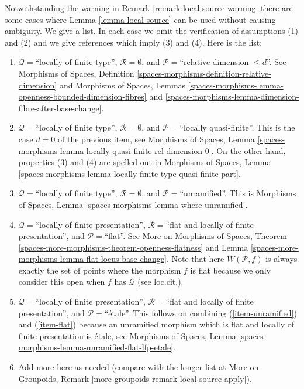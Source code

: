 \begin{remark}
\label{remark-local-source-apply}
Notwithstanding the warning in
Remark \ref{remark-local-source-warning}
there are some cases where
Lemma \ref{lemma-local-source}
can be used without causing ambiguity.
We give a list. In each case we omit the verification of
assumptions (1) and (2) and we give references which imply
(3) and (4). Here is the list:
\begin{enumerate}
\item
\label{item-rel-dim-leq-d}
$\mathcal{Q} = $``locally of finite type'', $\mathcal{R} = \emptyset$,
and $\mathcal{P} =$``relative dimension $\leq d$''.
See
Morphisms of Spaces,
Definition \ref{spaces-morphisms-definition-relative-dimension}
and
Morphisms of Spaces, Lemmas
\ref{spaces-morphisms-lemma-openness-bounded-dimension-fibres} and
\ref{spaces-morphisms-lemma-dimension-fibre-after-base-change}.
\item
\label{item-loc-quasi-finite}
$\mathcal{Q} =$``locally of finite type'', $\mathcal{R} = \emptyset$,
and $\mathcal{P} =$``locally quasi-finite''.
This is the case $d = 0$ of the previous item, see
Morphisms of Spaces, Lemma
\ref{spaces-morphisms-lemma-locally-quasi-finite-rel-dimension-0}.
On the other hand, properties (3) and (4) are spelled out in
Morphisms of Spaces, Lemma
\ref{spaces-morphisms-lemma-locally-finite-type-quasi-finite-part}.
\item
\label{item-unramified}
$\mathcal{Q} = $``locally of finite type'', $\mathcal{R} = \emptyset$,
and $\mathcal{P} =$``unramified''. This is
Morphisms of Spaces, Lemma \ref{spaces-morphisms-lemma-where-unramified}.
\item
\label{item-flat}
$\mathcal{Q} =$``locally of finite presentation'',
$\mathcal{R} =$``flat and locally of finite presentation'', and
$\mathcal{P} =$``flat''. See
More on Morphisms of Spaces, Theorem
\ref{spaces-more-morphisms-theorem-openness-flatness} and
Lemma \ref{spaces-more-morphisms-lemma-flat-locus-base-change}.
Note that here $W(\mathcal{P}, f)$ is always exactly the set of points
where the morphism $f$ is flat because we only consider this open
when $f$ has $\mathcal{Q}$ (see loc.cit.).
\item
\label{item-etale}
$\mathcal{Q} =$``locally of finite presentation'',
$\mathcal{R} =$``flat and locally of finite presentation'', and
$\mathcal{P}=$``\'etale''. This follows on combining
(\ref{item-unramified}) and (\ref{item-flat}) because an unramified
morphism which is flat and locally of finite presentation is \'etale, see
Morphisms of Spaces,
Lemma \ref{spaces-morphisms-lemma-unramified-flat-lfp-etale}.
\item Add more here as needed (compare with the longer list at
More on Groupoids, Remark \ref{more-groupoids-remark-local-source-apply}).
\end{enumerate}
\end{remark}











